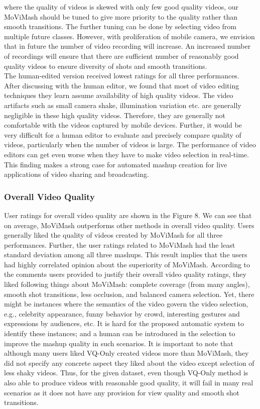 \documentclass{sig-alternate}
\begin{document}
{{{where the quality of videos is skewed with only few good quality
videos, our MoViMash should be tuned to give more priority to
the quality rather than smooth transitions. The further tuning can
be done by selecting video from multiple future classes. However,
with proliferation of mobile camera, we envision that in future the
number of video recording will increase. An increased number of
recordings will ensure that there are sufficient number of reasonably
good quality videos to ensure diversity of shots and smooth
transitions.\\
The human-edited version received lowest ratings for all three
performances. After discussing with the human editor, we found
that most of video editing techniques they learn assume availability
of high quality videos. The video artifacts such as small camera 
shake, illumination variation etc. are generally negligible in these
high quality videos. Therefore, they are generally not comfortable
with the videos captured by mobile devices. Further, it would be
very difficult for a human editor to evaluate and precisely compare
quality of videos, particularly when the number of videos is large.
The performance of video editors can get even worse when they
have to make video selection in real-time. This finding makes a
strong case for automated mashup creation for live applications of
video sharing and broadcasting.
\subsubsection{Overall Video Quality}
User ratings for overall video quality are shown in the Figure 8.
We can see that on average, MoViMash outperforms other methods
in overall video quality. Users generally liked the quality of
videos created by MoViMash for all three performances. Further,
the user ratings related to MoViMash had the least standard deviation
among all three mashups. This result implies that the users
had highly correlated opinion about the superiority of MoViMash.
According to the comments users provided to justify their overall
video quality ratings, they liked following things about MoViMash:
complete coverage (from many angles), smooth shot transitions,
less occlusion, and balanced camera selection. Yet, there might
be instances where the semantics of the video govern the video
selection, e.g., celebrity appearance, funny behavior by crowd, interesting
gestures and expressions by audiences, etc. It is hard for
the proposed automatic system to identify these instances; and a
human can be introduced in the selection to improve the mashup
quality in such scenarios.
It is important to note that although many users liked VQ-Only
created videos more than MoViMash, they did not specify any concrete
aspect they liked about the video except selection of less
shaky videos. Thus, for the given dataset, even though VQ-Only
method is also able to produce videos with reasonable good quality,
it will fail in many real scenarios as it does not have any provision
for view quality and smooth shot transitions.

}}}
\end{document}
